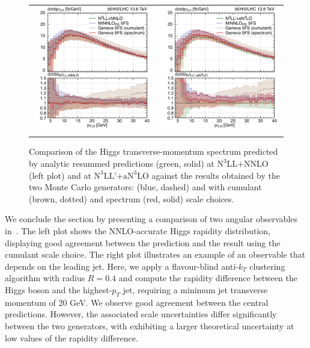 \documentclass[11pt,a4paper]{article}
\begin{document}
\begin{figure}[t!]
\begin{center}
\begin{tabular}{cc}
\includegraphics[width=.45\textwidth, page=1]{plots/5fs/genevaminnlo/n3llnnloresvsMCs-withspectrum.pdf}&
\includegraphics[width=.45\textwidth, page=1]{plots/5fs/genevaminnlo/n3llan3loresvsMCs-withspectrum.pdf}
\end{tabular}
\vspace*{1ex}
\caption{Comparison of the Higgs transverse-momentum spectrum predicted by analytic resummed predictions (green, solid) at $\text{N}^3\text{LL+NNLO}$ (left plot) and at $\text{N}^3\text{LL'+aN}^3\text{LO}$ against the results obtained by the two Monte Carlo generators: \minnlo{} (blue, dashed) and \GENEVA{} with cumulant (brown, dotted) and spectrum (red, solid) scale choices. \label{fig:resVSMCs}}
\end{center}
\end{figure}

We conclude the section by presenting a comparison of two angular observables in~. The left plot shows the NNLO-accurate Higgs rapidity distribution, displaying good agreement between the \minnlo{} prediction and the \GENEVA{} result using the cumulant scale choice. The right plot illustrates an example of an observable that depends on the leading jet. Here, we apply a flavour-blind anti-$k_T$ clustering algorithm with radius $R = 0.4$ and compute the rapidity difference between the Higgs boson and the highest-$p_T$ jet, requiring a minimum jet transverse momentum of 20 GeV. We observe good agreement between the central predictions. However, the associated scale uncertainties differ significantly between the two generators, with \GENEVA{} exhibiting a larger theoretical uncertainty at low values of the rapidity difference.
\end{document}
